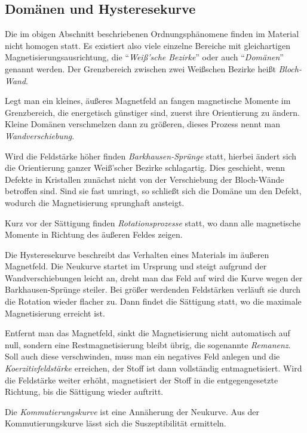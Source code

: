 \documentclass[12pt,a4paper]{scrartcl}
\numberwithin{equation}{section} %
\renewcommand{\[}{} %
\renewcommand{\]}{\noindent} %
\begin{document}
\hypertarget{domuxe4nen-und-hysteresekurve}{%
\subsection{Domänen und Hysteresekurve}\label{domuxe4nen-und-hysteresekurve}}

Die im obigen Abschnitt beschriebenen Ordnungsphänomene finden im Material nicht homogen statt. Es existiert also viele einzelne Bereiche mit gleichartigen Magnetisierungsausrichtung, die ``\emph{Weiß'sche Bezirke}'' oder auch ``\emph{Domänen}'' genannt werden. Der Grenzbereich zwischen zwei Weißschen Bezirke heißt \emph{Bloch-Wand}.

Legt man ein kleines, äußeres Magnetfeld an fangen magnetische Momente im Grenzbereich, die energetisch günstiger sind, zuerst ihre Orientierung zu ändern. Kleine Domänen verschmelzen dann zu größeren, dieses Prozess nennt man \emph{Wandverschiebung}.

Wird die Feldstärke höher finden \emph{Barkhausen-Sprünge} statt, hierbei ändert sich die Orientierung ganzer Weiß'scher Bezirke schlagartig. Dies geschieht, wenn Defekte in Kristallen zunächst nicht von der Verschiebung der Bloch-Wände betroffen sind. Sind sie fast umringt, so schließt sich die Domäne um den Defekt, wodurch die Magnetisierung sprunghaft ansteigt.

Kurz vor der Sättigung finden \emph{Rotationsprozesse} statt, wo dann alle magnetische Momente in Richtung des äußeren Feldes zeigen.

Die Hysteresekurve beschreibt das Verhalten eines Materials im äußeren Magnetfeld. Die Neukurve startet im Ursprung und steigt aufgrund der Wandverschiebungen leicht an, dreht man das Feld auf wird die Kurve wegen der Barkhausen-Sprünge steiler. Bei größer werdenden Feldstärken verläuft sie durch die Rotation wieder flacher zu. Dann findet die Sättigung statt, wo die maximale Magnetisierung erreicht ist.

Entfernt man das Magnetfeld, sinkt die Magnetisierung nicht automatisch auf null, sondern eine Restmagnetisierung bleibt übrig, die sogenannte \emph{Remanenz}. Soll auch diese verschwinden, muss man ein negatives Feld anlegen und die \emph{Koerzitivfeldstärke} erreichen, der Stoff ist dann vollständig entmagnetisiert. Wird die Feldstärke weiter erhöht, magnetisiert der Stoff in die entgegengesetzte Richtung, bis die Sättigung wieder auftritt.

Die \emph{Kommutierungskurve} ist eine Annäherung der Neukurve. Aus der Kommutierungskurve lässt sich die Suszeptibilität ermitteln.
\end{document}
